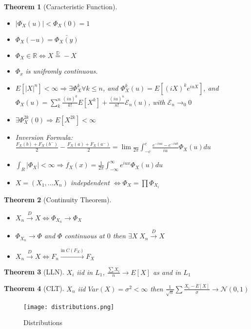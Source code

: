 \documentclass{article}
\newtheorem{theorem}{Theorem}
\begin{document}
\begin{theorem}[Caracteristic Function]
  \begin{itemize}
  \item $|\Phi_X(u)| < \Phi_X(0) = 1$
  \item $\Phi_X(-u) = \bar {\Phi_X(y)}$
  \item $\Phi_X \in \mathbb R \iff X \overset{\mathbb D}{=} -X$
  \item $\Phi_x$ is unifromly continuous.
  \item $E[|X|^n] < \infty \Rightarrow \exists \Phi^{k}_X \forall k \le n$, and $\Phi_X^k(u) = E[(iX)^ke^{iuX}]$, and $\Phi_X(u) = \sum_k^n \frac{(iu)^k}{k!}E[X^k] + \frac{(iu)^n}{n!}\mathcal E_n(u)$, with $\mathcal E_n \rightarrow_0 0$
  \item $\exists \Phi^{2k}_X(0) \Rightarrow E[X^{2k}] < \infty$
  \item Inversion Formula: $\frac{F_X(b) + F_X(b^-)}{2}- \frac{F_X(a) + F_X(a^-)}{2} = \lim \frac{}{2\pi} \int_{-c}^{c} \frac{e^{-iua} - e^{-iub}}{iu}\Phi_X(u) du$
  \item $\int_R |\Phi_X| < \infty \Rightarrow f_X(x) = \frac{1}{2\pi} \int_{-\infty}^{\infty} e^{iux} \Phi_X(u) du$
  \item $X = (X_1, \ldots X_n)$ indepdendent $\iff \Phi_X = \prod \Phi_{X_i}$
  \end{itemize}
\end{theorem}
\begin{theorem}[Continuity Theorem]
  \begin{itemize}
  \item $X_n \overset{D}{\rightarrow} X \iff \Phi_{X_n} \rightarrow \Phi_X$
  \item $\Phi_{X_n} \rightarrow \Phi$ and $\Phi$ continuous at $0$ then $\exists X \; X_n \overset{D}{\rightarrow} X$
  \item $X_n \overset{D}{\rightarrow} X \iff F_n \overset{\text{in} \; C(F_X)}\rightarrow F_X$
  \end{itemize}
\end{theorem}
\begin{theorem}[LLN]
  $X_i$ iid in $L_1$, $\frac{\sum X_i}{n} \rightarrow E[X]$ as and in $L_1$
\end{theorem}
\begin{theorem}[CLT]
  $X_n$ iid $Var(X) = \sigma^2 < \infty$ then $\frac{1}{\sqrt n}\sum \frac{X_i - E[X]}{\sigma} \rightarrow \mathcal N(0, 1)$
\end{theorem}
\begin{figure}
  \centering
  \texttt{[image: distributions.png]}
  \caption{Distributions}
\end{figure}
\end{document}

